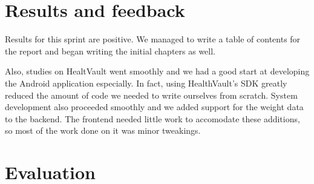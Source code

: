 \section{Results and feedback}

Results for this sprint are positive. We managed to write a table of contents for the report
and began writing the initial chapters as well.

Also, studies on HealtVault went smoothly and we had a good start at developing the Android application
especially. In fact, using HealthVault's SDK greatly reduced the amount of code we needed to write ourselves
from scratch.
System development also proceeded smoothly and we added support for the weight data to the backend.
The frontend needed little work to accomodate these additions, so most of the work done on it
was minor tweakings.

\section{Evaluation}

